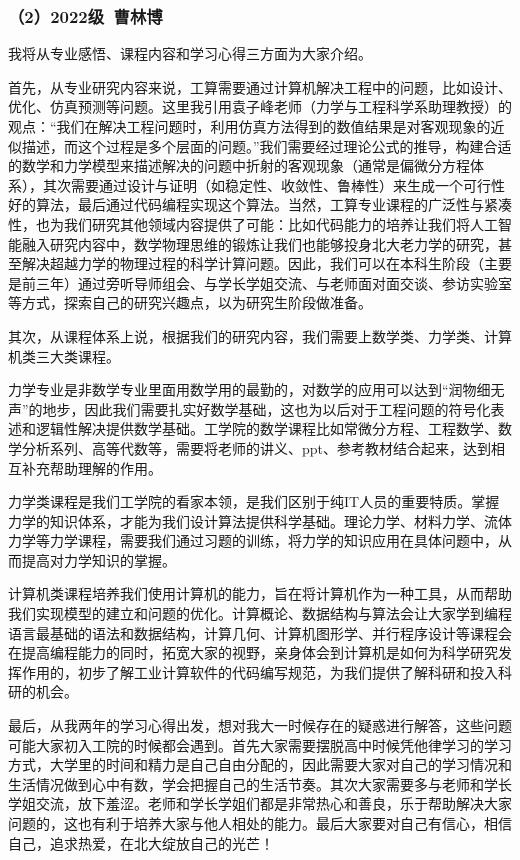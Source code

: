 \documentclass[11pt,oneside]{book}
\begin{document}
\subsubsection{（2）2022级\ 曹林博}

我将从专业感悟、课程内容和学习心得三方面为大家介绍。

首先，从专业研究内容来说，工算需要通过计算机解决工程中的问题，比如设计、优化、仿真预测等问题。这里我引用袁子峰老师（力学与工程科学系助理教授）的观点：“我们在解决工程问题时，利用仿真方法得到的数值结果是对客观现象的近似描述，而这个过程是多个层面的问题。”我们需要经过理论公式的推导，构建合适的数学和力学模型来描述解决的问题中折射的客观现象（通常是偏微分方程体系），其次需要通过设计与证明（如稳定性、收敛性、鲁棒性）来生成一个可行性好的算法，最后通过代码编程实现这个算法。当然，工算专业课程的广泛性与紧凑性，也为我们研究其他领域内容提供了可能：比如代码能力的培养让我们将人工智能融入研究内容中，数学物理思维的锻炼让我们也能够投身北大老力学的研究，甚至解决超越力学的物理过程的科学计算问题。因此，我们可以在本科生阶段（主要是前三年）通过旁听导师组会、与学长学姐交流、与老师面对面交谈、参访实验室等方式，探索自己的研究兴趣点，以为研究生阶段做准备。

其次，从课程体系上说，根据我们的研究内容，我们需要上数学类、力学类、计算机类三大类课程。

力学专业是非数学专业里面用数学用的最勤的，对数学的应用可以达到“润物细无声”的地步，因此我们需要扎实好数学基础，这也为以后对于工程问题的符号化表述和逻辑性解决提供数学基础。工学院的数学课程比如常微分方程、工程数学、数学分析系列、高等代数等，需要将老师的讲义、ppt、参考教材结合起来，达到相互补充帮助理解的作用。

力学类课程是我们工学院的看家本领，是我们区别于纯IT人员的重要特质。掌握力学的知识体系，才能为我们设计算法提供科学基础。理论力学、材料力学、流体力学等力学课程，需要我们通过习题的训练，将力学的知识应用在具体问题中，从而提高对力学知识的掌握。

计算机类课程培养我们使用计算机的能力，旨在将计算机作为一种工具，从而帮助我们实现模型的建立和问题的优化。计算概论、数据结构与算法会让大家学到编程语言最基础的语法和数据结构，计算几何、计算机图形学、并行程序设计等课程会在提高编程能力的同时，拓宽大家的视野，亲身体会到计算机是如何为科学研究发挥作用的，初步了解工业计算软件的代码编写规范，为我们提供了解科研和投入科研的机会。

最后，从我两年的学习心得出发，想对我大一时候存在的疑惑进行解答，这些问题可能大家初入工院的时候都会遇到。首先大家需要摆脱高中时候凭他律学习的学习方式，大学里的时间和精力是自己自由分配的，因此需要大家对自己的学习情况和生活情况做到心中有数，学会把握自己的生活节奏。其次大家需要多与老师和学长学姐交流，放下羞涩。老师和学长学姐们都是非常热心和善良，乐于帮助解决大家问题的，这也有利于培养大家与他人相处的能力。最后大家要对自己有信心，相信自己，追求热爱，在北大绽放自己的光芒！
\end{document}

